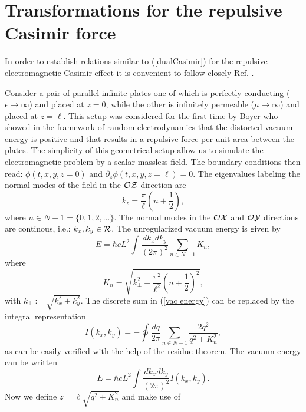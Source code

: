 \documentclass[a4paper,12pt]{article}
\begin{document}
\section{Transformations for the repulsive Casimir force}
%
In order to establish relations similar to (\ref{dualCasimir}) for the repulsive electromagnetic Casimir effect it is convenient to follow closely Ref. \cite{Fukushima&Ohta2001}.

Consider a pair of parallel infinite plates one of which is perfectly conducting ($\epsilon\to\infty$) and placed at $z=0$, while the other is infinitely permeable ($\mu\to\infty$) and placed at $z=\ell$. This setup was considered for the first time by Boyer \cite{Boyer1974} who showed in the framework of random electrodynamics that the distorted vacuum energy is positive and that results in a repulsive force per unit area between the plates. The simplicity of this geometrical setup allow us to simulate the electromagnetic problem by a scalar massless field. The boundary conditions then read: $\phi(t,x,y,z=0)$ and $\partial_z\phi (t,x,y,z=\ell)=0$. The eigenvalues labeling the normal modes of the field in the ${\cal OZ}$ direction are
%
\begin{equation}
k_z=\frac{\pi}{\ell}\left(n+\frac{1}{2}\right), 
\end{equation}
%
where $n \in N-1=\lbrace 0, 1, 2, ...\rbrace$. The normal modes  in the ${\cal OX}$ and ${\cal OY}$ directions are continous, i.e.: $k_x, k_y \in \cal{R}$. The unregularized vacuum energy is given by
%
\begin{equation}\label{vac energy}
E=\hbar c L^2\int \frac{dk_xdk_y}{\left(2\pi\right)^2}\sum_{n\in N-1}K_n,
\end{equation}
%
where
\begin{equation}
K_n=\sqrt{k_\bot^2+\frac{\pi^2}{\ell^2}\left(n+\frac{1}{2}\right)^2},
\end{equation}
%
with $k_\bot:=\sqrt{k_x^2+k_y^2}$. The discrete sum in (\ref{vac energy}) can be replaced by the integral representation
%
\begin{equation}
I(k_x,k_y)=-\oint\frac{dq}{2\pi}\sum_{n\in N-1}\frac{2q^2}{q^2+K_n^2},
\end{equation}
%
as can be easily verified with the help of the residue theorem. The vacuum energy can be written
%
\begin{equation}
E=\hbar c L^2\int \frac{dk_xdk_y}{\left(2\pi\right)^2}I(k_x,k_y).
\end{equation}
%
Now we define $z=\ell\sqrt{q^2+K_n^2}$ and make use of \cite{Gradshteyn&Ryzhik94}
\end{document}
